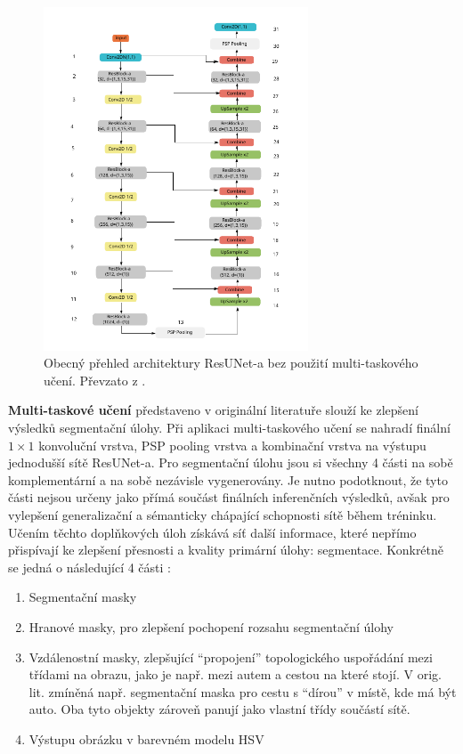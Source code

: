 \begin{figure}[H]
\centering
\includegraphics[width=0.7\textwidth,keepaspectratio]{Figures/resuneta_overview.pdf}
\caption[Obecný přehled architektury ResUNet-a]{Obecný přehled architektury ResUNet-a bez použití multi-taskového učení. Převzato z \cite{resuneta}. }
\label{fig:resuneta_overview}
\end{figure}

\textbf{Multi-taskové učení} představeno v originální literatuře slouží ke zlepšení výsledků segmentační úlohy. Při aplikaci multi-taskového učení se nahradí finální $1\times1$ konvoluční vrstva, PSP pooling vrstva a kombinační vrstva na výstupu jednodušší sítě ResUNet-a. Pro segmentační úlohu jsou si všechny 4 části na sobě komplementární a na sobě nezávisle vygenerovány. Je nutno podotknout, že tyto části nejsou určeny jako přímá součást finálních inferenčních výsledků, avšak pro vylepšení generalizační a sémanticky chápající schopnosti sítě během tréninku. Učením těchto doplňkových úloh získává síť další informace, které nepřímo přispívají ke zlepšení přesnosti a kvality primární úlohy: segmentace. Konkrétně se jedná o následující 4 části \cite{resuneta}: 
\begin{enumerate}
    \item Segmentační masky
    \item Hranové masky, pro zlepšení pochopení rozsahu segmentační úlohy
    \item Vzdálenostní masky, zlepšující \enquote{propojení} topologického uspořádání mezi třídami na obrazu, jako je např. mezi autem a cestou na které stojí. V orig. lit. zmíněná např. segmentační maska pro cestu s \enquote{dírou} v místě, kde má být auto. Oba tyto objekty zároveň panují jako vlastní třídy součástí sítě.
    \item Výstupu obrázku v barevném modelu HSV
\end{enumerate}
\endinput